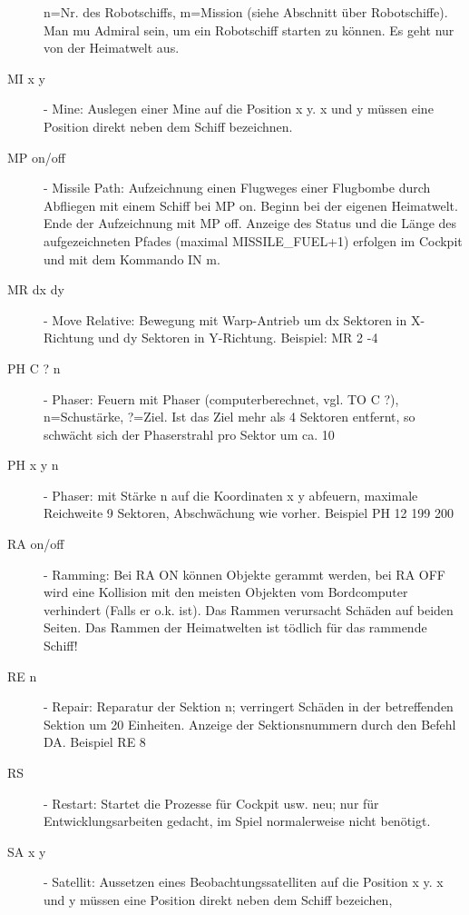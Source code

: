 \begin{description}
                n=Nr. des Robotschiffs, m=Mission (siehe Abschnitt \"uber
                Robotschiffe).
                Man mu\3 Admiral sein, um ein Robotschiff starten zu k\"onnen.
                Es geht nur von der Heimatwelt aus.
\item [MI x y] - Mine: Auslegen einer Mine auf die  
        Position x y. x und y m\"ussen eine
        Position direkt neben dem Schiff bezeichnen.
\item [MP on/off] - Missile Path: Aufzeichnung einen Flugweges einer 
            Flugbombe durch Abfliegen mit einem Schiff bei MP on. Beginn
            bei der eigenen Heimatwelt. Ende der Aufzeichnung mit MP off.
            Anzeige des Status und die
            L\"ange des aufgezeichneten Pfades (maximal MISSILE\_FUEL+1)
            erfolgen im Cockpit und mit dem Kommando IN m.
\item [MR dx dy] - Move Relative: Bewegung mit Warp-Antrieb um 
           dx Sektoren in X-Richtung und dy Sektoren
           in Y-Richtung. Beispiel: MR 2 -4
\item [PH C ? n] - Phaser: Feuern mit Phaser (computerberechnet, vgl. TO C ?),
           n=Schu\3st\"arke, ?=Ziel.
           Ist das Ziel mehr als 4 Sektoren entfernt, so schw\"acht sich
           der Phaserstrahl pro Sektor um ca. 10%
\item [PH x y n] - Phaser: mit St\"arke n auf die Koordinaten x y abfeuern,
           maximale Reichweite 9 Sektoren, Abschw\"achung wie vorher. 
           Beispiel PH 12 199 200
\item [RA on/off] - Ramming: Bei RA ON k\"onnen Objekte gerammt werden, 
            bei RA OFF
            wird eine Kollision mit den meisten Objekten vom Bordcomputer
            verhindert (Falls er o.k. ist). Das Rammen verursacht Sch\"aden
            auf beiden Seiten. Das Rammen der Heimatwelten ist t\"odlich f\"ur
            das rammende Schiff!
\item [RE n] - Repair: Reparatur der Sektion n; verringert Sch\"aden in der 
       betreffenden Sektion um 20 Einheiten. Anzeige der Sektionsnummern
       durch den Befehl DA. Beispiel RE 8
\item [RS] - Restart: Startet die Prozesse f\"ur Cockpit usw. neu; nur
             f\"ur Entwicklungsarbeiten gedacht, im Spiel normalerweise nicht
             ben\"otigt.
\item [SA x y] - Satellit: Aussetzen eines Beobachtungssatelliten 
        auf die Position
        x y. x und y m\"ussen eine Position direkt neben dem Schiff bezeichen,

\end{description}
